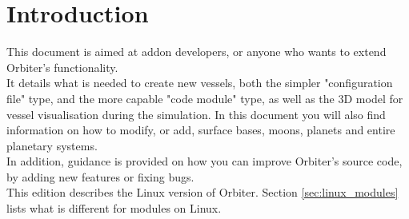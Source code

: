\documentclass[Orbiter Developer Manual.tex]{subfiles}
\begin{document}
\section{Introduction}
This document is aimed at addon developers, or anyone who wants to extend Orbiter's functionality.\\
It details what is needed to create new vessels, both the simpler "configuration file" type, and the more capable "code module" type, as well as the 3D model for vessel visualisation during the simulation.
In this document you will also find information on how to modify, or add, surface bases, moons, planets and entire planetary systems.\\
In addition, guidance is provided on how you can improve Orbiter's source code, by adding new features or fixing bugs.\\
This edition describes the Linux version of Orbiter. Section \ref{sec:linux_modules} lists what is different for modules on Linux.
\end{document}
